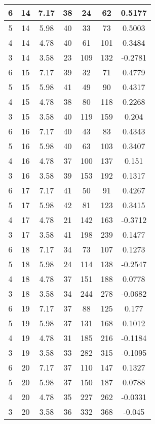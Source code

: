 \documentclass[letterpaper, 12pt]{article}
\begin{document}
\begin{longtable}{|c|c|c|c|c|c|c|}
\hline
6 & 14 & 7.17 & 38 & 24 & 62 & 0.5177 \\
\hline
5 & 14 & 5.98 & 40 & 33 & 73 & 0.5003 \\
\hline
4 & 14 & 4.78 & 40 & 61 & 101 & 0.3484 \\
\hline
3 & 14 & 3.58 & 23 & 109 & 132 & -0.2781 \\
\hline
6 & 15 & 7.17 & 39 & 32 & 71 & 0.4779 \\
\hline
5 & 15 & 5.98 & 41 & 49 & 90 & 0.4317 \\
\hline
4 & 15 & 4.78 & 38 & 80 & 118 & 0.2268 \\
\hline
3 & 15 & 3.58 & 40 & 119 & 159 & 0.204 \\
\hline
6 & 16 & 7.17 & 40 & 43 & 83 & 0.4343 \\
\hline
5 & 16 & 5.98 & 40 & 63 & 103 & 0.3407 \\
\hline
4 & 16 & 4.78 & 37 & 100 & 137 & 0.151 \\
\hline
3 & 16 & 3.58 & 39 & 153 & 192 & 0.1317 \\
\hline
6 & 17 & 7.17 & 41 & 50 & 91 & 0.4267 \\
\hline
5 & 17 & 5.98 & 42 & 81 & 123 & 0.3415 \\
\hline
4 & 17 & 4.78 & 21 & 142 & 163 & -0.3712 \\
\hline
3 & 17 & 3.58 & 41 & 198 & 239 & 0.1477 \\
\hline
6 & 18 & 7.17 & 34 & 73 & 107 & 0.1273 \\
\hline
5 & 18 & 5.98 & 24 & 114 & 138 & -0.2547 \\
\hline
4 & 18 & 4.78 & 37 & 151 & 188 & 0.0778 \\
\hline
3 & 18 & 3.58 & 34 & 244 & 278 & -0.0682 \\
\hline
6 & 19 & 7.17 & 37 & 88 & 125 & 0.177 \\
\hline
5 & 19 & 5.98 & 37 & 131 & 168 & 0.1012 \\
\hline
4 & 19 & 4.78 & 31 & 185 & 216 & -0.1184 \\
\hline
3 & 19 & 3.58 & 33 & 282 & 315 & -0.1095 \\
\hline
6 & 20 & 7.17 & 37 & 110 & 147 & 0.1327 \\
\hline
5 & 20 & 5.98 & 37 & 150 & 187 & 0.0788 \\
\hline
4 & 20 & 4.78 & 35 & 227 & 262 & -0.0331 \\
\hline
3 & 20 & 3.58 & 36 & 332 & 368 & -0.045 \\
\hline
\end{longtable}
\end{document}
